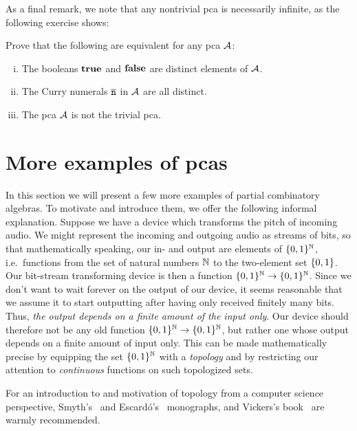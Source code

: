As a final remark, we note that any nontrivial pca is necessarily infinite, as
the following exercise shows:
\begin{exercise}\label{exer:nontrivial-pca}
  Prove that the following are equivalent for any pca \(\AA\):
  \begin{enumerate}[(i)]
  \item The booleans \(\pcatrue\) and \(\pcafalse\) are distinct elements of
    \(\AA\).
  \item The Curry numerals \(\numeral{n}\) in \(\AA\) are all distinct.
  \item The pca \(\AA\) is not the trivial pca.
  \end{enumerate}
\end{exercise}

\section{More examples of pcas}

In this section we will present a few more examples of partial combinatory
algebras. To motivate and introduce them, we offer the following informal
explanation. Suppose we have a device which transforms the pitch of incoming
audio. We might represent the incoming and outgoing audio as streams of bits, so
that mathematically speaking, our in- and output are elements of
\(\set{0,1}^\Nat\), i.e.\ functions from the set of natural numbers \(\Nat\) to
the two-element set \(\set{0,1}\).
%
Our bit-stream transforming device is then a function
\(\set{0,1}^\Nat \to \set{0,1}^\Nat\).
%
Since we don't want to wait forever on the output of our device, it seems
reasonable that we assume it to start outputting after having only received
finitely many bits.
%
Thus, \emph{the output depends on a finite amount of the input only}.
%
Our device should therefore not be any old function
\(\set{0,1}^\Nat \to \set{0,1}^\Nat\), but rather one whose output depends on a
finite amount of input only.
%
This can be made mathematically precise by equipping the set \(\set{0,1}^\Nat\)
with a \emph{topology} and by restricting our attention to \emph{continuous}
functions on such topologized sets.

For an introduction to and motivation of topology from a computer science
perspective, Smyth's~\cite{Smyth1992} and Escard\'o's~\cite{Escardo2004}
monographs, and Vickers's book~\cite{Vickers1996} are warmly recommended.


